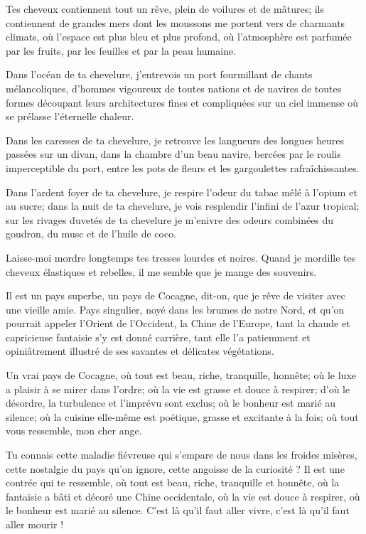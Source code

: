 Tes cheveux contiennent tout un rêve, plein de voilures et de mâtures;
ils contiennent de grandes mers dont les moussons me portent vers de
charmants climats, où l’espace est plus bleu et plus
profond, où l’atmosphère est parfumée par les fruits,
par les feuilles et par la peau humaine.

Dans l’océan de ta chevelure,
j’entrevois un port fourmillant de chants
mélancoliques, d’hommes vigoureux de toutes nations et
de navires de toutes formes découpant leurs architectures fines et
compliquées sur un ciel immense où se prélasse
l’éternelle chaleur.

Dans les caresses de ta chevelure, je retrouve les langueurs des longues
heures passées sur un divan, dans la chambre d’un beau
navire, bercées par le roulis imperceptible du port, entre les pots de
fleurs et les gargoulettes rafraîchissantes.

Dans l’ardent foyer de ta chevelure, je respire
l’odeur du tabac mêlé à l’opium et au
sucre; dans la nuit de ta chevelure, je vois resplendir
l’infini de l’azur tropical; sur les
rivages duvetés de ta chevelure je m’enivre des odeurs
combinées du goudron, du musc et de l’huile de coco.

Laisse{}-moi mordre longtemps tes tresses lourdes et noires. Quand je
mordille tes cheveux élastiques et rebelles, il me semble que je mange
des souvenirs.
\ \\


Il est un pays superbe, un pays de Cocagne, dit{}-on, que je rêve de
visiter avec une vieille amie. Pays singulier, noyé dans les brumes de
notre Nord, et qu’on pourrait appeler
l’Orient de l’Occident, la Chine de
l’Europe, tant la chaude et capricieuse fantaisie
s’y est donné carrière, tant elle l’a
patiemment et opiniâtrement illustré de ses savantes et délicates
végétations.

Un vrai pays de Cocagne, où tout est beau, riche, tranquille, honnête;
où le luxe a plaisir à se mirer dans l’ordre; où la
vie est grasse et douce à respirer; d’où le désordre,
la turbulence et l’imprévu sont exclus; où le bonheur
est marié au silence; où la cuisine elle{}-même est poétique, grasse et
excitante à la fois; où tout vous ressemble, mon cher ange.

Tu connais cette maladie fiévreuse qui s’empare de nous
dans les froides misères, cette nostalgie du pays
qu’on ignore, cette angoisse de la curiosité ? Il est
une contrée qui te ressemble, où tout est beau, riche, tranquille et
honnête, où la fantaisie a bâti et décoré une Chine occidentale, où la
vie est douce à respirer, où le bonheur est marié au silence.
C’est là qu’il faut aller vivre,
c’est là qu’il faut aller mourir !

